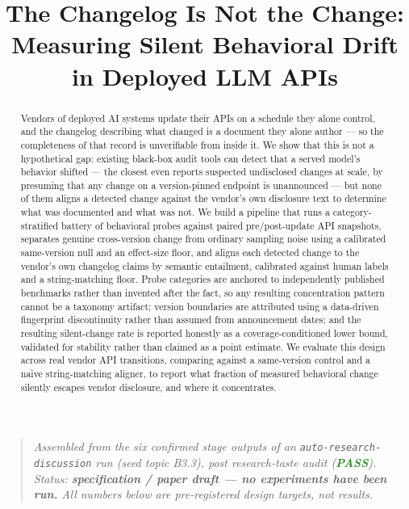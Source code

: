 \documentclass[11pt]{article}
\title{\textbf{The Changelog Is Not the Change:\\ Measuring Silent Behavioral Drift in Deployed LLM APIs}}
\author{}
\date{}
\begin{document}
\maketitle
\vspace{-2em}

\begin{quote}
\small\textit{Assembled from the six confirmed stage outputs of an \texttt{auto-research-discussion} run (seed topic B3.3), post research-taste audit (\textcolor{ForestGreen}{\textbf{PASS}}). Status: \textbf{specification / paper draft --- no experiments have been run.} All numbers below are pre-registered design targets, not results.}
\end{quote}

\begin{abstract}
Vendors of deployed AI systems update their APIs on a schedule they alone control, and the changelog describing what changed is a document they alone author --- so the completeness of that record is unverifiable from inside it. We show that this is not a hypothetical gap: existing black-box audit tools can detect that a served model's behavior shifted --- the closest even reports suspected undisclosed changes at scale, by presuming that any change on a version-pinned endpoint is unannounced --- but none of them aligns a detected change against the vendor's own disclosure text to determine what was documented and what was not. We build a pipeline that runs a category-stratified battery of behavioral probes against paired pre/post-update API snapshots, separates genuine cross-version change from ordinary sampling noise using a calibrated same-version null and an effect-size floor, and aligns each detected change to the vendor's own changelog claims by semantic entailment, calibrated against human labels and a string-matching floor. Probe categories are anchored to independently published benchmarks rather than invented after the fact, so any resulting concentration pattern cannot be a taxonomy artifact; version boundaries are attributed using a data-driven fingerprint discontinuity rather than assumed from announcement dates; and the resulting silent-change rate is reported honestly as a coverage-conditioned lower bound, validated for stability rather than claimed as a point estimate. We evaluate this design across real vendor API transitions, comparing against a same-version control and a naive string-matching aligner, to report what fraction of measured behavioral change silently escapes vendor disclosure, and where it concentrates.
\end{abstract}
\end{document}
